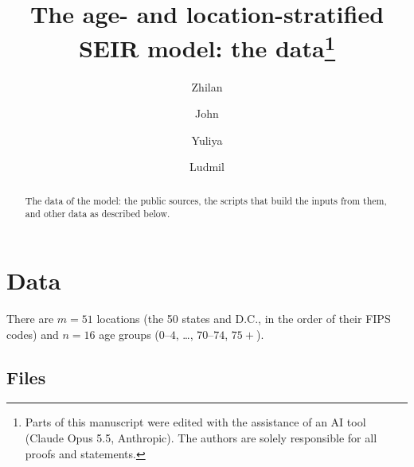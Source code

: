 \documentclass[11pt]{article}
\title{The age- and location-stratified SEIR model: the data\thanks{Parts of this
manuscript were edited with the assistance of an AI tool (Claude Opus 5.5, Anthropic).
The authors are solely responsible for all proofs and statements.}}
\author{Zhilan \and John \and Yuliya \and Ludmil}
\date{}
\theoremstyle{remark}
\begin{document}
\maketitle

\begin{abstract}
The data of the model: the public sources, the scripts that build the inputs from them,
and other data as described below.
\end{abstract}

\section{Data}\label{sec-data}
There are $m=51$ locations (the 50 states and D.C., in the order of their FIPS codes)
and $n=16$ age groups ($0$--$4$, \dots, $70$--$74$, $75+$).

\subsection{Files}\label{sec-files}
\end{document}
